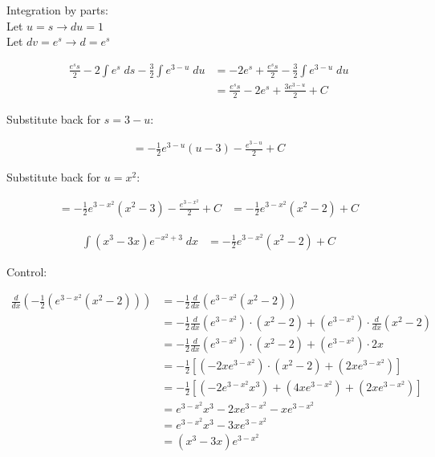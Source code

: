 \documentclass[a4paper]{article}
\begin{document}
\begin{enumerate}
\begin{enumerate}
	
Integration by parts:\\

Let $u = s \rightarrow du = 1$\\
Let $dv = e^s \rightarrow d = e^s$ 	
	
\begin{align*}
\frac{e^ss}{2} - 2 \int e^s \; ds - \frac{3}{2} \int e^{3-u} \; du &= -2e^s + \frac{e^ss}{2} - \frac{3}{2} \int e^{3-u} \; du\\
&= \frac{e^ss}{2} - 2e^s + \frac{3e^{3-u}}{2} + C
\end{align*}

Substitute back for $s = 3 - u$:	
	
\begin{align*}
= - \frac{1}{2} e^{3-u}(u-3) - \frac{e^{3-u}}{2} + C
\end{align*}	

Substitute back for $u = x^2$:

\begin{align*}
= - \frac{1}{2}e^{3-x^2}(x^2 - 3) - \frac{e^{3-x^2}}{2} + C &= -\frac{1}{2}e^{3-x^2}(x^2 - 2) + C
\end{align*}	

\begin{align*}
\int (x^3 - 3x)e^{-x^2+3} \; dx &= -\frac{1}{2}e^{3-x^2}(x^2 - 2) + C
\end{align*}	

\newpage

Control:

\begin{align*}
\frac{d}{dx}(-\frac{1}{2}(e^{3-x^2}(x^2 - 2))) &= -\frac{1}{2}\frac{d}{dx}(e^{3-x^2}(x^2 - 2))\\
&= - \frac{1}{2} \frac{d}{dx}(e^{3-x^2}) \cdot (x^2 - 2) + (e^{3-x^2}) \cdot \frac{d}{dx}(x^2 - 2)\\
&= - \frac{1}{2} \frac{d}{dx}(e^{3-x^2}) \cdot (x^2 - 2) + (e^{3-x^2}) \cdot 2x\\
&= -\frac{1}{2} [(-2xe^{3-x^2}) \cdot (x^2-2)+ (2xe^{3-x^2})]\\
&= -\frac{1}{2}[(-2e^{3-x^2}x^3)+(4xe^{3-x^2}) + (2xe^{3-x^2})]\\
&= e^{3-x^2}x^3 - 2xe^{3-x^2} - xe^{3-x^2}\\
&= e^{3-x^2}x^3 - 3xe^{3-x^2}\\
&= (x^3 - 3x) e^{3-x^2} 
\end{align*}	
	
	
	
	
	
\end{enumerate}



\end{enumerate}
\end{document}
